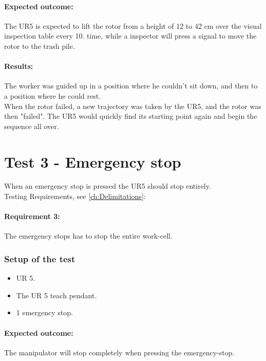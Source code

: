 \paragraph{Expected outcome:} 
The UR5 is expected to lift the rotor from a height of 12 to 42 cm over the visual inspection table every 10. time, while a inspector will press a signal to move the rotor to the trash pile. 

\paragraph{Results: }

The worker was guided up in a position where he couldn't sit down, and then to a position where he could rest.\\
When the rotor failed, a new trajectory was taken by the UR5, and the rotor was then "failed". The UR5 would quickly find its starting point again and begin the sequence all over.\\

\section{Test 3 - Emergency stop}

When an emergency stop is pressed the UR5 should stop entirely.\\
Testing Requirements, see  \ref{ch:Delimitations}:\\

\paragraph{Requirement 3:} The emergency stops has to stop the entire work-cell.\\

\subsubsection{Setup of the test}

\begin{itemize}
    \item UR 5.
    \item The UR 5 teach pendant.
    \item 1 emergency stop.
\end{itemize}

\paragraph{Expected outcome:}
The manipulator will stop completely when pressing the emergency-stop.

